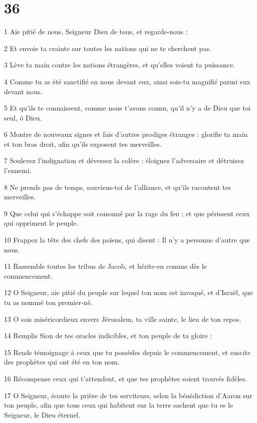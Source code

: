 \chapter{36}

\par 1 Aie pitié de nous, Seigneur Dieu de tous, et regarde-nous :
\par 2 Et envoie ta crainte sur toutes les nations qui ne te cherchent pas.
\par 3 Lève ta main contre les nations étrangères, et qu'elles voient ta puissance.
\par 4 Comme tu as été sanctifié en nous devant eux, ainsi sois-tu magnifié parmi eux devant nous.
\par 5 Et qu'ils te connaissent, comme nous t'avons connu, qu'il n'y a de Dieu que toi seul, ô Dieu.
\par 6 Montre de nouveaux signes et fais d'autres prodiges étranges : glorifie ta main et ton bras droit, afin qu'ils exposent tes merveilles.
\par 7 Soulevez l'indignation et déversez la colère : éloignez l'adversaire et détruisez l'ennemi.
\par 8 Ne prends pas de temps, souviens-toi de l'alliance, et qu'ils racontent tes merveilles.
\par 9 Que celui qui s'échappe soit consumé par la rage du feu ; et que périssent ceux qui oppriment le peuple.
\par 10 Frappez la tête des chefs des païens, qui disent : Il n'y a personne d'autre que nous.
\par 11 Rassemble toutes les tribus de Jacob, et hérite-en comme dès le commencement.
\par 12 O Seigneur, aie pitié du peuple sur lequel ton nom est invoqué, et d'Israël, que tu as nommé ton premier-né.
\par 13 O sois miséricordieux envers Jérusalem, ta ville sainte, le lieu de ton repos.
\par 14 Remplis Sion de tes oracles indicibles, et ton peuple de ta gloire :
\par 15 Rends témoignage à ceux que tu possèdes depuis le commencement, et suscite des prophètes qui ont été en ton nom.
\par 16 Récompense ceux qui t'attendent, et que tes prophètes soient trouvés fidèles.
\par 17 O Seigneur, écoute la prière de tes serviteurs, selon la bénédiction d'Aaron sur ton peuple, afin que tous ceux qui habitent sur la terre sachent que tu es le Seigneur, le Dieu éternel.
